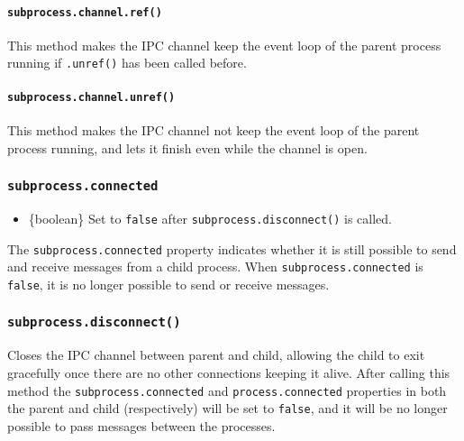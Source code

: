 \paragraph{\texorpdfstring{\texttt{subprocess.channel.ref()}}{subprocess.channel.ref()}}\label{subprocess.channel.ref}

This method makes the IPC channel keep the event loop of the parent
process running if \texttt{.unref()} has been called before.

\paragraph{\texorpdfstring{\texttt{subprocess.channel.unref()}}{subprocess.channel.unref()}}\label{subprocess.channel.unref}

This method makes the IPC channel not keep the event loop of the parent
process running, and lets it finish even while the channel is open.

\subsubsection{\texorpdfstring{\texttt{subprocess.connected}}{subprocess.connected}}\label{subprocess.connected}

\begin{itemize}
\tightlist
\item
  \{boolean\} Set to \texttt{false} after
  \texttt{subprocess.disconnect()} is called.
\end{itemize}

The \texttt{subprocess.connected} property indicates whether it is still
possible to send and receive messages from a child process. When
\texttt{subprocess.connected} is \texttt{false}, it is no longer
possible to send or receive messages.

\subsubsection{\texorpdfstring{\texttt{subprocess.disconnect()}}{subprocess.disconnect()}}\label{subprocess.disconnect}

Closes the IPC channel between parent and child, allowing the child to
exit gracefully once there are no other connections keeping it alive.
After calling this method the \texttt{subprocess.connected} and
\texttt{process.connected} properties in both the parent and child
(respectively) will be set to \texttt{false}, and it will be no longer
possible to pass messages between the processes.

